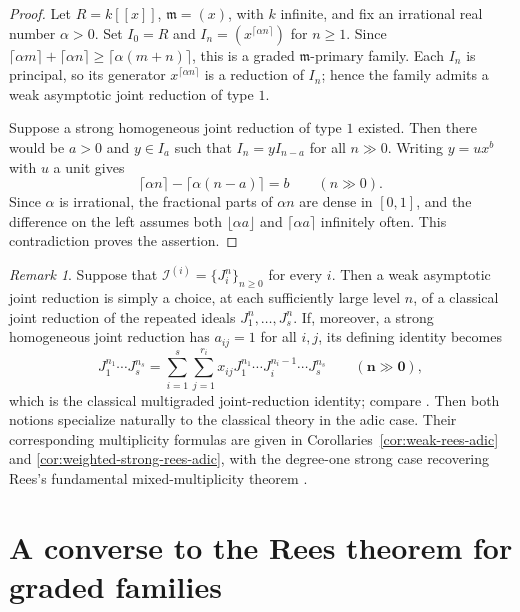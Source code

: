 \documentclass[reqno,12pt]{amsart}
\theoremstyle{plain}
\theoremstyle{definition}
\theoremstyle{remark}
\newtheorem{rem}[prop]{Remark}
\numberwithin{equation}{section}
\begin{document}
\begin{proof}
Let $R=k[[x]]$, $\mathfrak m=(x)$, with $k$ infinite, and fix an
irrational real number $\alpha>0$. Set $I_0=R$ and
$I_n=(x^{\lceil\alpha n\rceil})$ for $n\geq1$. Since
$\lceil\alpha m\rceil+\lceil\alpha n\rceil
\geq\lceil\alpha(m+n)\rceil$, this is a graded
$\mathfrak m$-primary family. Each $I_n$ is principal, so its generator
$x^{\lceil\alpha n\rceil}$ is a reduction of $I_n$; hence the family
admits a weak asymptotic joint reduction of type $1$.

Suppose a strong homogeneous joint reduction of type $1$ existed. Then
there would be $a>0$ and $y\in I_a$ such that
$I_n=yI_{n-a}$ for all $n\gg0$. Writing $y=ux^b$ with $u$ a unit gives
\[
\lceil\alpha n\rceil-
\lceil\alpha(n-a)\rceil=b
\qquad(n\gg0).
\]
Since $\alpha$ is irrational, the fractional parts of $\alpha n$ are
dense in $[0,1]$, and the difference on the left assumes both
$\lfloor\alpha a\rfloor$ and $\lceil\alpha a\rceil$ infinitely often.
This contradiction proves the assertion.
\end{proof}




\begin{rem}\label{rem:adic-case}
Suppose that
$\mathcal I^{(i)}=\{J_i^n\}_{n\geq0}$ for every $i$. Then a weak
asymptotic joint reduction is simply a choice, at each sufficiently
large level $n$, of a classical joint reduction of the repeated ideals
$J_1^n,\ldots,J_s^n$. If, moreover, a strong homogeneous joint reduction has
$a_{ij}=1$ for all $i,j$, its defining identity becomes
\[
J_1^{n_1}\cdots J_s^{n_s}
=
\sum_{i=1}^{s}\sum_{j=1}^{r_i}
x_{ij}
J_1^{n_1}\cdots J_i^{n_i-1}\cdots J_s^{n_s}
\qquad(\mathbf n\gg\mathbf0),
\]
which is the classical multigraded joint-reduction identity; compare
\cite[Definition~1.6]{SarkarVerma}. Then both notions specialize naturally to the classical theory in the
adic case. Their corresponding multiplicity formulas are given in
Corollaries~\ref{cor:weak-rees-adic} and
\ref{cor:weighted-strong-rees-adic}, with the degree-one strong case
recovering Rees's fundamental mixed-multiplicity theorem
\cite[Theorem~17.4.9]{SwansonHuneke}.
\end{rem}

\section{A converse to the Rees theorem for graded families}
\label{sec:converse}
\end{document}
